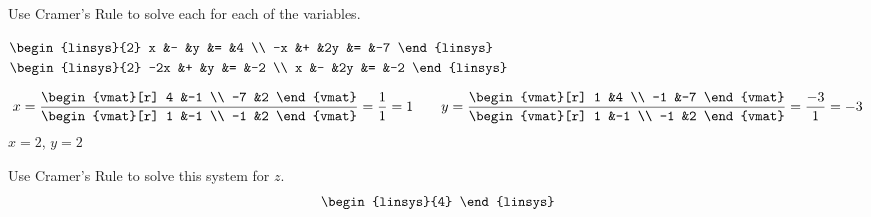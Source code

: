 \begin{exercises}
  \item 
    Use Cramer's Rule to solve each for each of the variables.
    \begin{exparts*}
      \partsitem $\begin{linsys}{2}
                    x  &- &y  &=  &4  \\
                   -x  &+ &2y &=  &-7
                  \end{linsys}$
      \partsitem $\begin{linsys}{2}
                    -2x  &+  &y  &=  &-2 \\
                      x  &-  &2y &=  &-2  
                  \end{linsys}$
    \end{exparts*}
    \begin{answer}
      \begin{exparts*}
        \partsitem 
          \begin{equation*}
            x=
             \frac{ \begin{vmat}[r]
                       4  &-1  \\
                      -7  &2   
                    \end{vmat}  }{
                    \begin{vmat}[r]
                       1  &-1  \\
                      -1  &2 
                    \end{vmat}  }
            =\frac{1}{1}=1
            \qquad
            y=
             \frac{ \begin{vmat}[r]
                       1  &4  \\
                      -1  &-7   
                    \end{vmat}  }{
                    \begin{vmat}[r]
                       1  &-1  \\
                      -1  &2 
                    \end{vmat}  }
            =\frac{-3}{1}=-3
          \end{equation*}
        \partsitem $x=2$, $y=2$
      \end{exparts*} 
    \end{answer}
  \item 
    Use Cramer's Rule to solve this system for \( z \).
    \begin{equation*}
      \begin{linsys}{4}

\end{linsys}
\end{equation*}
\end{exercises}
